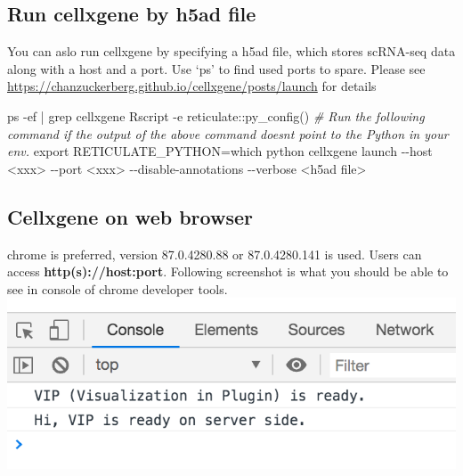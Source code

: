 \documentclass[
]{book}
\newenvironment{Shaded}{\begin{snugshade}}{\end{snugshade}}
\newcommand{\AttributeTok}[1]{\textcolor[rgb]{0.77,0.63,0.00}{#1}}
\newcommand{\CommentTok}[1]{\textcolor[rgb]{0.56,0.35,0.01}{\textit{#1}}}
\newcommand{\NormalTok}[1]{#1}
\newcommand{\OtherTok}[1]{\textcolor[rgb]{0.56,0.35,0.01}{#1}}
\newcommand{\SpecialCharTok}[1]{\textcolor[rgb]{0.00,0.00,0.00}{#1}}
\newcommand{\StringTok}[1]{\textcolor[rgb]{0.31,0.60,0.02}{#1}}
\begin{document}
\hypertarget{run-cellxgene-by-h5ad-file}{%
\subsection{Run cellxgene by h5ad file}\label{run-cellxgene-by-h5ad-file}}

You can aslo run cellxgene by specifying a h5ad file, which stores scRNA-seq data along with a host and a port.
Use `ps' to find used ports to spare. Please see \url{https://chanzuckerberg.github.io/cellxgene/posts/launch} for details

\begin{Shaded}
\begin{Highlighting}[]
\NormalTok{ps }\SpecialCharTok{{-}}\NormalTok{ef }\SpecialCharTok{|}\NormalTok{ grep cellxgene}
\NormalTok{Rscript }\SpecialCharTok{{-}}\NormalTok{e }\StringTok{\textquotesingle{}reticulate::py\_config()\textquotesingle{}}
\CommentTok{\# Run the following command if the output of the above command doesn\textquotesingle{}t point to the Python in your env.}
\NormalTok{export RETICULATE\_PYTHON}\OtherTok{=}\StringTok{\textasciigrave{}}\AttributeTok{which python}\StringTok{\textasciigrave{}}
\NormalTok{cellxgene launch }\SpecialCharTok{{-}{-}}\NormalTok{host }\SpecialCharTok{\textless{}}\NormalTok{xxx}\SpecialCharTok{\textgreater{}} \SpecialCharTok{{-}{-}}\NormalTok{port }\SpecialCharTok{\textless{}}\NormalTok{xxx}\SpecialCharTok{\textgreater{}} \SpecialCharTok{{-}{-}}\NormalTok{disable}\SpecialCharTok{{-}}\NormalTok{annotations }\SpecialCharTok{{-}{-}}\NormalTok{verbose }\SpecialCharTok{\textless{}}\NormalTok{h5ad file}\SpecialCharTok{\textgreater{}}
\end{Highlighting}
\end{Shaded}

\hypertarget{cellxgene-on-web-browser}{%
\subsection{Cellxgene on web browser}\label{cellxgene-on-web-browser}}

chrome is preferred, version 87.0.4280.88 or 87.0.4280.141 is used. Users can access \textbf{http(s)://host:port}.
Following screenshot is what you should be able to see in console of chrome developer tools.
\includegraphics{cellonweb.png}
\end{document}

